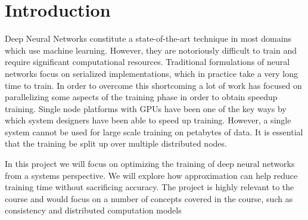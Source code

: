 \section{Introduction}
Deep Neural Networks constitute a state-of-the-art technique in most domains which use machine learning. However, they are notoriously difficult to train and require significant computational resources. Traditional formulations of neural networks focus on serialized implementations, which in practice take a very long time to train. In order to overcome this shortcoming a lot of work has focused on parallelizing some aspects of the training phase in order to obtain speedup training. Single node platforms with GPUs have been one of the key ways by which system designers have been able to speed up training. However, a single system cannot be used for large scale training on petabytes of data. It is essential that the training be split up over multiple distributed nodes.

In this project we will focus on optimizing the training of deep neural networks from a systems perspective.
We will explore how approximation can help reduce training time without sacrificing accuracy. The project
is highly relevant to the course and would focus on a number of concepts covered in the course, such as
consistency and distributed computation models

